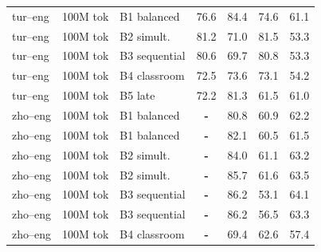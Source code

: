 \begin{table}[t]
\begin{tabular}{lll cc cc}
tur--eng & 100M tok & B1 balanced & \cellcolor[rgb]{0.853,1.000,0.853} 76.6 & \cellcolor[rgb]{0.812,1.000,0.812} 84.4 & \cellcolor[rgb]{0.825,1.000,0.825} 74.6 & \cellcolor[rgb]{0.909,1.000,0.909} 61.1 \\
tur--eng & 100M tok & B2 simult. & \cellcolor[rgb]{0.827,1.000,0.827} 81.2 & \cellcolor[rgb]{0.885,1.000,0.885} 71.0 & \cellcolor[rgb]{0.776,1.000,0.776} 81.5 & \cellcolor[rgb]{0.973,1.000,0.973} 53.3 \\
tur--eng & 100M tok & B3 sequential & \cellcolor[rgb]{0.831,1.000,0.831} 80.6 & \cellcolor[rgb]{0.893,1.000,0.893} 69.7 & \cellcolor[rgb]{0.781,1.000,0.781} 80.8 & \cellcolor[rgb]{0.973,1.000,0.973} 53.3 \\
tur--eng  & 100M tok & B4 classroom & \cellcolor[rgb]{0.876,1.000,0.876} 72.5 & \cellcolor[rgb]{0.871,1.000,0.871} 73.6 & \cellcolor[rgb]{0.836,1.000,0.836} 73.1 & \cellcolor[rgb]{0.965,1.000,0.965} 54.2 \\
tur--eng  & 100M tok & B5 late & \cellcolor[rgb]{0.877,1.000,0.877} 72.2 & \cellcolor[rgb]{0.829,1.000,0.829} 81.3 & \cellcolor[rgb]{0.918,1.000,0.918} 61.5 & \cellcolor[rgb]{0.909,1.000,0.909} 61.0 \\
zho--eng & 100M tok & B1 balanced & \textbf{-} & \cellcolor[rgb]{0.832,1.000,0.832} 80.8 & \cellcolor[rgb]{0.923,1.000,0.923} 60.9 & \cellcolor[rgb]{0.900,1.000,0.900} 62.2 \\
zho--eng  & 100M tok & B1 balanced & \textbf{-} & \cellcolor[rgb]{0.825,1.000,0.825} 82.1 & \cellcolor[rgb]{0.925,1.000,0.925} 60.5 & \cellcolor[rgb]{0.905,1.000,0.905} 61.5 \\
zho--eng & 100M tok & B2 simult. & \textbf{-} & \cellcolor[rgb]{0.815,1.000,0.815} 84.0 & \cellcolor[rgb]{0.921,1.000,0.921} 61.1 & \cellcolor[rgb]{0.891,1.000,0.891} 63.2 \\
zho--eng  & 100M tok & B2 simult. & \textbf{-} & \cellcolor[rgb]{0.805,1.000,0.805} 85.7 & \cellcolor[rgb]{0.918,1.000,0.918} 61.6 & \cellcolor[rgb]{0.889,1.000,0.889} 63.5 \\
zho--eng & 100M tok & B3 sequential & \textbf{-} & \cellcolor[rgb]{0.803,1.000,0.803} 86.2 & \cellcolor[rgb]{0.978,1.000,0.978} 53.1 & \cellcolor[rgb]{0.884,1.000,0.884} 64.1 \\
zho--eng  & 100M tok & B3 sequential & \textbf{-} & \cellcolor[rgb]{0.803,1.000,0.803} 86.2 & \cellcolor[rgb]{0.954,1.000,0.954} 56.5 & \cellcolor[rgb]{0.891,1.000,0.891} 63.3 \\
zho--eng & 100M tok & B4 classroom & \textbf{-} & \cellcolor[rgb]{0.894,1.000,0.894} 69.4 & \cellcolor[rgb]{0.910,1.000,0.910} 62.6 & \cellcolor[rgb]{0.939,1.000,0.939} 57.4 \\

\end{tabular}
\end{table}
